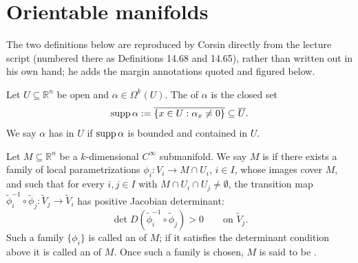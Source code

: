 
\section{Orientable manifolds}
\label{sec:orientable_manifolds}

\begin{ainote}
The two definitions below are reproduced by Corsin directly from the lecture script (numbered
there as Definitions 14.68 and 14.65), rather than written out in his own hand; he adds the
margin annotations quoted and figured below.
\end{ainote}

\begin{definition}
\label{def:support_of_k_form}
Let $U \subseteq \mathbb{R}^n$ be open and $\alpha \in \Omega^k(U)$. The 
of $\alpha$ is the closed set
\[\operatorname{supp}\alpha := \overline{\{x\in U : \alpha_x \neq 0\}} \subseteq \overline{U}.\]
We say $\alpha$ has  in $U$ if $\operatorname{supp}\alpha$ is bounded and contained
in $U$.
\end{definition}

\begin{definition}
\label{def:orientable_manifold}
Let $M \subseteq \mathbb{R}^n$ be a $k$-dimensional $C^\infty$ submanifold. We say $M$ is
  if there exists a family of local
parametrizations $\phi_i : V_i \to M \cap U_i$, $i \in I$, whose images cover $M$, and such
that for every $i,j \in I$ with $M \cap U_i \cap U_j \neq \emptyset$, the transition map
$\widetilde\phi_i^{-1}\circ\widetilde\phi_j : \widetilde V_j \to \widetilde V_i$ has positive
Jacobian determinant:
\[\det D(\widetilde\phi_i^{-1}\circ\widetilde\phi_j) > 0 \qquad \text{on } \widetilde V_j.\]
Such a family $\{\phi_i\}$ is called an  of $M$; if it satisfies the
determinant condition above it is called an  of $M$. Once such a family
is chosen, $M$ is said to be .
\end{definition}

